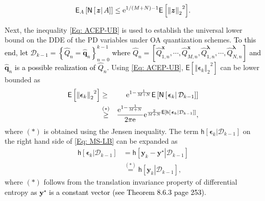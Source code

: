 \documentclass[10pt,twocolumn,twoside]{IEEEtran}
\begin{document}
\begin{eqnarray}\label{Eq: ACEP-UB}
{\mathsf E}_{A}\left[{\ensuremath{\mathsf{N}\left[\left.{{\ensuremath{\boldsymbol{{z}}}}}\right|{A}\right]}}\right]\leq {\ensuremath{{\rm e}^{{1/{\left({M+N}\right)}-1}}}}{\ensuremath{\mathsf{E}\left[{{\left\Vert{{\ensuremath{\boldsymbol{{z}}}}}\right\Vert_{{2}}}^2} \right]}}.
\end{eqnarray}

Next, the inequality \eqref{Eq: ACEP-UB} is used to establish the universal lower bound on the DDE of the PD variables under OA quantization schemes. \textcolor{black}{To this end, let $\mathcal{D}_{k-1}=\left\{\hat{Q}_n={\ensuremath{\boldsymbol{{\hat{q}}}}}_n\right\}_{n=0}^{k-1}$ where $\hat{Q}_n=\left[\hat{Q}^{{\ensuremath{\boldsymbol{{x}}}}}_{1,n},\cdots,\hat{Q}^{{\ensuremath{\boldsymbol{{x}}}}}_{M,n},\hat{Q}^{{\ensuremath{\boldsymbol{{\lambda}}}}}_{1,n},\cdots,\hat{Q}^{{\ensuremath{\boldsymbol{{\lambda}}}}}_{N,n}\right]$ and ${\ensuremath{\boldsymbol{{\hat{q}}}}}_n$ is a possible realization of $\hat{Q}_n$.} Using \eqref{Eq: ACEP-UB}, ${\ensuremath{\mathsf{E}\left[{{\left\Vert{{\ensuremath{\boldsymbol{{\epsilon}}}}_k}\right\Vert_{{2}}}^2} \right]}}$ can be lower bounded as
\begin{eqnarray}\label{Eq: MS-LB}
{\ensuremath{\mathsf{E}\left[{{\left\Vert{{\ensuremath{\boldsymbol{{\epsilon}}}}_k}\right\Vert_{{2}}}^2} \right]}}&\geq &{\ensuremath{{\rm e}^{{1-\frac{1}{M+N}}}}}{\ensuremath{\mathsf{E}\left[{{\ensuremath{\mathsf{N}\left[\left.{{\ensuremath{\boldsymbol{{\epsilon}}}}_k}\right|{\mathcal{D}_{k-1}}\right]}}} \right]}}\nonumber\\
&\stackrel{{\left({*}\right)}}{\geq}&\frac{{\ensuremath{{\rm e}^{{1-\frac{1}{M+N}}}}}}{{2\pi {\ensuremath{{\rm e}^{{}}}}}}{\ensuremath{{\rm e}^{{\frac{2}{M+N}{\ensuremath{\mathsf{E}\left[{{\ensuremath{\mathsf{h}\left[\left.{{\ensuremath{\boldsymbol{{\epsilon}}}}_k}\right|{\mathcal{D}_{k-1}}\right]}}} \right]}}}}}},
\end{eqnarray}
where ${\left({*}\right)}$ is obtained using the Jensen inequality. The term ${\ensuremath{\mathsf{h}\left[\left.{{\ensuremath{\boldsymbol{{\epsilon}}}}_k}\right|{\mathcal{D}_{k-1}}\right]}}$ on the right hand side of \eqref{Eq: MS-LB} can be expanded as
\begin{align}\label{Eq: TI}
{\ensuremath{\mathsf{h}\left[\left.{{\ensuremath{\boldsymbol{{\epsilon}}}}_k}\right|{\mathcal{D}_{k-1}}\right]}}&={\ensuremath{\mathsf{h}\left[\left.{{\ensuremath{\boldsymbol{{y}}}}_k-{\ensuremath{\boldsymbol{{y}}}}^\star}\right|{\mathcal{D}_{k-1}}\right]}}\nonumber\\
&\stackrel{{\left({*}\right)}}{=}{\ensuremath{\mathsf{h}\left[\left.{{\ensuremath{\boldsymbol{{y}}}}_k}\right|{\mathcal{D}_{k-1}}\right]}},
\end{align}
where ${\left({*}\right)}$ follows from the translation invariance property of differential entropy \textcolor{black}{as ${\ensuremath{\boldsymbol{{y}}}}^\star$ is a constant vector (see \cite{Cover} Theorem 8.6.3 page 253)}. 
\end{document}

